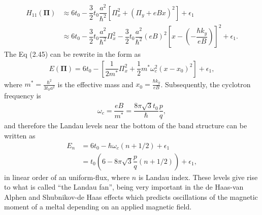 \documentclass{report}
\newcommand{\f}[2]{\dfrac{#1}{#2}}
\begin{document}
\begin{equation}
	\begin{aligned}
		H_{11}(\mathbf{\Pi})
		 & \approx 6 t_{0} - \f{3}{2} t_{0} \f{a^{2}}{\hbar^{2}} \left[ \Pi_{x}^{2} + \left(\Pi_{y} + e B x\right)^{2}\right] + \epsilon_{1}                                                           \\
		 & \approx 6 t_{0} - \f{3}{2} t_{0} \f{a^{2}}{\hbar^{2}} \Pi_{x}^{2} - \f{3}{2} t_{0} \f{a^{2}}{\hbar^{2}} (e B)^{2} \left[ x - \left(- \f{\hbar k_{y}}{eB}\right) \right]^{2} + \epsilon_{1}.
	\end{aligned}
\end{equation}
The Eq (2.45) can be rewrite in the form as
\begin{gather}
	E(\mathbf{\Pi}) = 6 t_{0} - \left[\f{1}{2m^{*}} \Pi_{x}^{2} + \f{1}{2} m^{*} \omega_{c}^{2}(x - x_{0})^{2}\right] + \epsilon_{1},
\end{gather}
where $m^{*} = \frac{\hbar^{2}}{3t_{0}a^{2}}$ is the effective mass and $x_{0} = \frac{\hbar k_{y}}{eB}$. Subsequently, the cyclotron frequency is
\begin{gather}
	\omega_{c} = \f{eB}{m^{*}} = \f{8 \pi \sqrt{3} t_{0}}{\hbar}  \f{p}{q},
\end{gather}
and therefore the Landau levels near the bottom of the band structure can be written as
\begin{equation}
	\begin{aligned}
		E_{n}
		 & = 6 t_{0} - \hbar \omega_{c} (n + 1 /2) + \epsilon_{1}                    \\
		 & = t_{0} \left(6 - 8\pi\sqrt{3} \f{p}{q}( n + 1 /2)\right) + \epsilon_{1},
	\end{aligned}
\end{equation}
in linear order of an uniform-flux, where $n$ is Landau index. These levels give rise to what is called ``the Landau fan'', being very important in the de Haas-van Alphen and Shubnikov-de Haas effects \cite{10.1119/1.1615568} which predicts oscillations of the magnetic moment of a meltal depending on an applied magnetic field.
\end{document}
